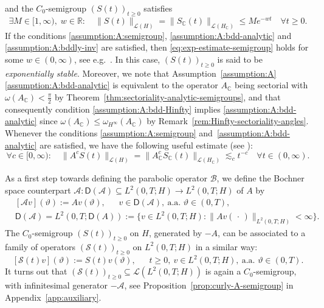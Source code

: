\documentclass[reqno]{amsart}
\numberwithin{equation}{section}
\newcommand{\R}{\mathbb{R}}
\newcommand{\C}{\mathbb{C}}
\newcommand{\cA}{\mathcal{A}}
\newcommand{\cB}{\mathcal{B}}
\newcommand{\cS}{\mathcal{S}}
\newcommand{\norm}[2]{     \| #1       \|_{ #2 }}
\newcommand{\from}{\colon}
\theoremstyle{remark}
\theoremstyle{definition}
\begin{document}
and the $C_0$-semigroup $(S(t))_{t\geq 0}$ satisfies
%
\begin{equation}\label{eq:exp-estimate-semigroup} 
\exists 
M \in [1,\infty), \; 
w \in \R: 
\quad 
\norm{S(t)}{\mathscr L(H)}
= \norm{S_\C(t)}{\mathscr L(H_\C)}
\leq 
M e^{-wt} 
\quad 
\forall t \geq 0.   
\end{equation}
% 
If the conditions  
\ref{assumption:A:semigroup}, \ref{assumption:A:bdd-analytic} and
\ref{assumption:A:bddly-inv} 
are satisfied, 
then \eqref{eq:exp-estimate-semigroup} 
holds for some $w \in (0,\infty)$,
see e.g.\ \cite[p.~70]{Pazy1983}. 
In this case, $(S(t))_{t\geq 0}$ is said to be \emph{exponentially stable}. 
%
Moreover, we note that 
Assumption~\ref{assumption:A}\ref{assumption:A:bdd-analytic} 
is equivalent to the operator $A_\C$ being sectorial 
with $\omega(A_\C) < \tfrac{\pi}{2}$ 
by Theorem~\ref{thm:sectoriality-analytic-semigroups},
and that consequently condition  
\ref{assumption:A:bdd-Hinfty} implies \ref{assumption:A:bdd-analytic} 
since $\omega(A_\C) \le \omega_{H^\infty}(A_\C)$ 
by Remark~\ref{rem:Hinfty-sectoriality-angles}.
Whenever the conditions  
\ref{assumption:A:semigroup} and~\ref{assumption:A:bdd-analytic}
are satisfied, we have 
the following useful estimate 
(see \cite[Proposition~3.4.3]{Haase2006}): 
%
\begin{equation}\label{eq:analytic-est-1}
\forall c \in [0,\infty): 
\quad 
\| A^c S(t) \|_{\mathscr L(H)} 
=
\| A_\C^c S_\C(t) \|_{\mathscr L(H_\C)} 
\lesssim_c 
t^{-c} 
\quad 
\forall 
t \in (0,\infty). 
\end{equation}
%

As a first step towards defining the parabolic operator $\cB$, 
we define the Bochner space counterpart 
$\cA\from \mathsf D(\cA) \subseteq L^2(0,T;H) \to L^2(0,T;H)$ 
of $A$ by
%
\begin{equation}\label{eq:def-cA} 
\begin{split}
&[\cA v](\vartheta)
:= Av(\vartheta), 
\quad\;\; 
v \in \mathsf D(\cA), 
\ 
\text{a.a.\ }\vartheta\in (0,T), 
\\
&\mathsf D(\cA) 
= L^2(0,T;\mathsf D(A)) 
:= 
\bigl\{ v \in L^2(0,T;H): \norm{ Av(\,\cdot\,)}{L^2(0,T;H)} < \infty \bigr\}.   
\end{split}
\end{equation}
%
The $C_0$-semigroup $(S(t))_{t\geq 0}$ on $H$, 
generated by $-A$, 
can be associated to a family of 
operators $(\cS(t))_{t\geq 0}$ on $L^2(0,T;H)$ 
in a similar way: 
%  
\begin{equation}\label{eq:def-cS}
[\cS(t)v](\vartheta) 
:= 
S(t)v(\vartheta), 
\quad\;\; 
t \geq 0, 
\   
v \in L^2(0,T;H),
\ 
\text{a.a.\ }\vartheta \in (0,T).
\end{equation}
% 
It turns out that 
$(\cS(t))_{t\geq 0}\subseteq\mathscr L(L^2(0,T;H))$ 
is again a $C_0$-semigroup,  
with infinitesimal generator $-\cA$, 
see Proposition~\ref{prop:curly-A-semigroup} 
in Appendix~\ref{app:auxiliary}.  
\end{document}
